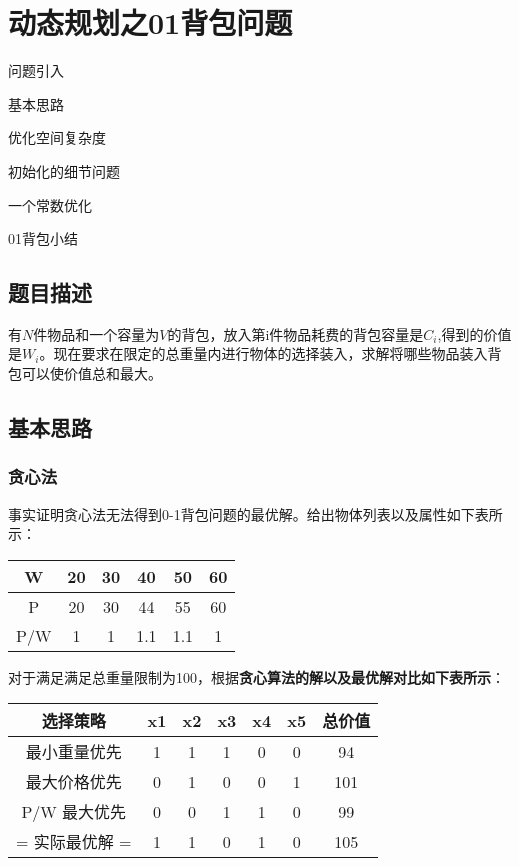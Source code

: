 \chapter{动态规划之01背包问题}

\begin{introduction}
	\item 问题引入
	\item 基本思路
	\item 优化空间复杂度
	\item 初始化的细节问题
	\item 一个常数优化
	\item 01背包小结
\end{introduction}

\section{题目描述}
有$N$件物品和一个容量为$V$的背包，放入第i件物品耗费的背包容量是$C_i$,得到的价值是$W_i$。现在要求在限定的总重量内进行物体的选择装入，求解将哪些物品装入背包可以使价值总和最大。

\section{基本思路}

\subsection{贪心法}
事实证明贪心法无法得到0-1背包问题的最优解。给出物体列表以及属性如下表所示：

\begin{tabular}{cccccc}
\toprule  %
W& 20& 30& 40& 50& 60\\
\midrule  %
P& 20& 30& 44& 55& 60\\
P/W& 1& 1& 1.1& 1.1& 1\\
\bottomrule %
\end{tabular}

对于满足满足总重量限制为100，根据\textbf{贪心算法的解以及最优解对比如下表所示}：

\begin{tabular}{ccccccc}
\toprule  %
选择策略& x1& x2& x3& x4& x5& 总价值\\
\midrule  %
最小重量优先& 1& 1& 1& 0& 0& 94\\
最大价格优先& 0& 1& 0& 0& 1& 101\\
P/W 最大优先& 0& 0& 1& 1& 0& 99\\
= 实际最优解 =& 1& 1& 0& 1& 0& 105\\ 
\bottomrule %
\end{tabular}

